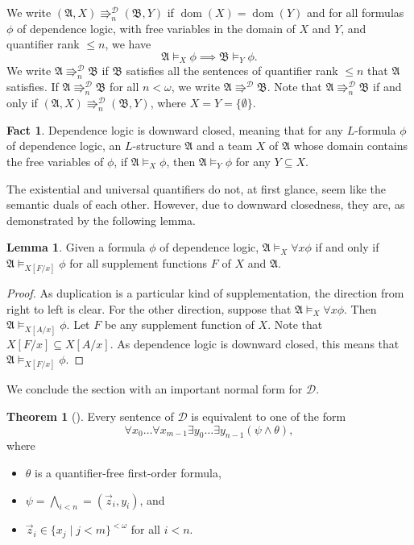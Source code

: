 \documentclass[12pt]{article}
\theoremstyle{definition}
\newtheorem{theorem}[definition]{Theorem}
\newtheorem{lemma}[definition]{Lemma}
\newtheorem{fact}[definition]{Fact}
\newcommand{\A}{\mathfrak{A}}
\newcommand{\B}{\mathfrak{B}}
\newcommand{\dep}{\mathop{=}}
\newcommand{\posEquiv}{\mathbin{\Rrightarrow}}
\newcommand{\deplog}{\mathcal D}
\DeclareMathOperator{\dom}{dom}
\begin{document}
We write $(\A,X)\posEquiv^\deplog_n(\B,Y)$ if $\dom(X) = \dom(Y)$ and for all formulas $\phi$ of dependence logic, with free variables in the domain of $X$ and $Y$, and quantifier rank $\leq n$, we have
\[
    \A\models_X\phi \implies \B\models_Y\phi.
\]
We write $\A\posEquiv^\deplog_n\B$ if $\B$ satisfies all the sentences of quantifier rank $\leq n$ that $\A$ satisfies. If $\A\posEquiv^\deplog_n\B$ for all $n<\omega$, we write $\A\posEquiv^\deplog\B$. Note that $\A\posEquiv^\deplog_n\B$ if and only if $(\A,X)\posEquiv^\deplog_n(\B,Y)$, where $X = Y = \{\emptyset\}$.

\begin{fact}
    Dependence logic is downward closed, meaning that for any $L$-formula $\phi$ of dependence logic, an $L$-structure $\A$ and a team $X$ of $\A$ whose domain contains the free variables of $\phi$, if $\A\models_X\phi$, then $\A\models_Y\phi$ for any $Y\subseteq X$.
\end{fact}

The existential and universal quantifiers do not, at first glance, seem like the semantic duals of each other. However, due to downward closedness, they are, as demonstrated by the following lemma.

\begin{lemma}\label{lemma: alt semantics for universal quantifier}
    Given a formula $\phi$ of dependence logic, $\A\models_X\forall x\phi$ if and only if $\A\models_{X[F/x]}\phi$ for all supplement functions $F$ of $X$ and $\A$.
\end{lemma}
\begin{proof}
    As duplication is a particular kind of supplementation, the direction from right to left is clear. For the other direction, suppose that $\A\models_X\forall x\phi$. Then $\A\models_{X[A/x]}\phi$. Let $F$ be any supplement function of $X$. Note that $X[F/x]\subseteq X[A/x]$. As dependence logic is downward closed, this means that $\A\models_{X[F/x]}\phi$.
\end{proof}

We conclude the section with an important normal form for $\deplog$.

\begin{theorem}[\cite{MR2351449}]\label{theorem: normal form}
    Every sentence of $\deplog$ is equivalent to one of the form
    \[
        \forall x_0\dots\forall x_{m-1}\exists y_0\dots\exists y_{n-1}(\psi\land\theta),
    \]
    where
    \begin{itemize}
        \item $\theta$ is a  quantifier-free first-order formula,
        \item $\psi = \bigwedge_{i<n}\dep(\vec z_i, y_i)$, and
        \item $\vec z_i \in\{x_j \mid j<m\}^{<\omega}$ for all $i<n$.
    \end{itemize}
\end{theorem}
\end{document}
